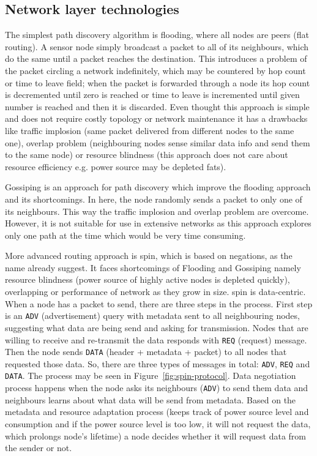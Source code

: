 \subsection{Network layer technologies}
The simplest path discovery algorithm is flooding, where all nodes are peers (flat routing). A sensor node simply broadcast a packet to all of its neighbours, which do the same until a packet reaches the destination. This introduces a problem of the packet circling a network indefinitely, which may be countered by hop count or time to leave field; when the packet is forwarded through a node its hop count is decremented until zero is reached or time to leave is incremented until given number is reached and then it is discarded. Even thought this approach is simple and does not require costly topology or network maintenance it has a drawbacks like traffic implosion (same packet delivered from different nodes to the same one), overlap problem (neighbouring nodes sense similar data info and send them to the same node) or resource blindness (this approach does not care about resource efficiency e.g. power source may be depleted fats).

Gossiping is an approach for path discovery which improve the flooding approach and its shortcomings. In here, the node randomly sends a packet to only one of its neighbours. This way the traffic implosion and overlap problem are overcome. However, it is not suitable for use in extensive networks as this approach explores only one path at the time which would be very time consuming. 

More advanced routing approach is \acrfull{spin}, which is based on negations, as the name already suggest. It faces shortcomings of Flooding and Gossiping namely resource blindness (power source of highly active nodes is depleted quickly), overlapping or performance of network as they grow in size. \acrshort{spin} is data-centric. When a node has a packet to send, there are three steps in the process. First step is an \texttt{ADV} (advertisement) query with metadata sent to all neighbouring nodes, suggesting what data are being send and asking for transmission. Nodes that are willing to receive and re-transmit the data responds with \texttt{REQ} (request) message. Then the node sends \texttt{DATA} (header + metadata + packet) to all nodes that requested those data. So, there are three types of messages in total: \texttt{ADV}, \texttt{REQ} and \texttt{DATA}. The process may be seen in Figure~\ref{fig:spin-protocol}. Data negotiation process happens when the node asks its neighbours (\texttt{ADV}) to send them data and neighbours learns about what data will be send from metadata. Based on the metadata and resource adaptation process (keeps track of power source level and consumption and if the power source level is too low, it will not request the data, which prolongs node’s lifetime) a node decides whether it will request data from the sender or not.

